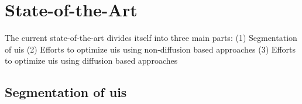 \documentclass[10pt,a4paper]{scrartcl} %
\begin{document}
\section{State-of-the-Art} \label{ch:state-of-the-art}
The current state-of-the-art divides itself into three main parts: 
(1) Segmentation of \ac{uis}
(2) Efforts to optimize \ac{uis} using non-diffusion based approaches
(3) Efforts to optimize \ac{uis} using diffusion based approaches
\subsection{Segmentation of \ac{uis}}
\end{document}
